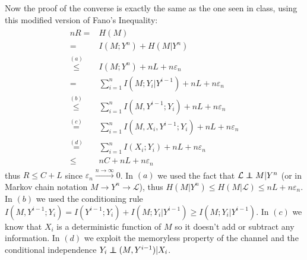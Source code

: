 Now the proof of the converse is exactly the same as the one seen in class, using this modified version of Fano's Inequality:
%
\begin{align}
\begin{split}
nR =& H(M)\\
=&  I(M;Y^n) + H(M|Y^n)\\
\stackrel{(a)}{\leq}& I(M;Y^n) + nL + n\varepsilon_n\\
=& \sum_{i=1}^n I(M;Y_i|Y^{i-1}) + nL+n\varepsilon_n\\
\stackrel{(b)}{\leq}& \sum_{i=1}^n I(M,Y^{i-1};Y_i) + nL+n\varepsilon_n\\
\stackrel{(c)}{=}& \sum_{i=1}^n I(M,X_i,Y^{i-1};Y_i) + nL+n\varepsilon_n\\
\stackrel{(d)}{=}& \sum_{i=1}^n I(X_i;Y_i) + nL+n\varepsilon_n\\
\leq& nC + nL+n\varepsilon_n
\end{split}
\end{align}
%
thus $R\leq C+L$ since $\varepsilon_n \xrightarrow{n\rightarrow\infty} 0$. In $(a)$ we used the fact that $\mathcal{L} \independent M |Y^n$ (or in Markov chain notation $M\rightarrow Y^n\rightarrow \mathcal{L}$), thus $H(M|Y^n)\leq H(M|\mathcal{L}) \leq nL + n\varepsilon_n$. In $(b)$ we used the conditioning rule $I(M,Y^{i-1};Y_i) = I(Y^{i-1};Y_i) + I(M;Y_i|Y^{i-1}) \geq I(M;Y_i|Y^{i-1})$. In $(c)$ we know that $X_i$ is a deterministic function of $M$ so it doesn't add or subtract any information. In $(d)$ we exploit the memoryless property of the channel and the conditional independence $Y_i \independent (M,Y^{i-1})|X_i$.

